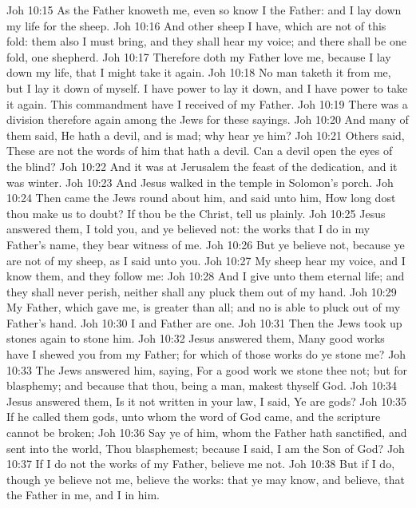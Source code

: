 \vs Joh 10:15 As the Father knoweth me, even so know I the Father: and I lay down my life for the sheep.
\vs Joh 10:16 And other sheep I have, which are not of this fold: them also I must bring, and they shall hear my voice; and there shall be one fold,  one shepherd.
\vs Joh 10:17 Therefore doth my Father love me, because I lay down my life, that I might take it again.
\vs Joh 10:18 No man taketh it from me, but I lay it down of myself. I have power to lay it down, and I have power to take it again. This commandment have I received of my Father.
\vs Joh 10:19 There was a division therefore again among the Jews for these sayings.
\vs Joh 10:20 And many of them said, He hath a devil, and is mad; why hear ye him?
\vs Joh 10:21 Others said, These are not the words of him that hath a devil. Can a devil open the eyes of the blind?
\vs Joh 10:22 And it was at Jerusalem the feast of the dedication, and it was winter.
\vs Joh 10:23 And Jesus walked in the temple in Solomon's porch.
\vs Joh 10:24 Then came the Jews round about him, and said unto him, How long dost thou make us to doubt? If thou be the Christ, tell us plainly.
\vs Joh 10:25 Jesus answered them, I told you, and ye believed not: the works that I do in my Father's name, they bear witness of me.
\vs Joh 10:26 But ye believe not, because ye are not of my sheep, as I said unto you.
\vs Joh 10:27 My sheep hear my voice, and I know them, and they follow me:
\vs Joh 10:28 And I give unto them eternal life; and they shall never perish, neither shall any  pluck them out of my hand.
\vs Joh 10:29 My Father, which gave  me, is greater than all; and no  is able to pluck  out of my Father's hand.
\vs Joh 10:30 I and  Father are one.
\vs Joh 10:31 Then the Jews took up stones again to stone him.
\vs Joh 10:32 Jesus answered them, Many good works have I shewed you from my Father; for which of those works do ye stone me?
\vs Joh 10:33 The Jews answered him, saying, For a good work we stone thee not; but for blasphemy; and because that thou, being a man, makest thyself God.
\vs Joh 10:34 Jesus answered them, Is it not written in your law, I said, Ye are gods?
\vs Joh 10:35 If he called them gods, unto whom the word of God came, and the scripture cannot be broken;
\vs Joh 10:36 Say ye of him, whom the Father hath sanctified, and sent into the world, Thou blasphemest; because I said, I am the Son of God?
\vs Joh 10:37 If I do not the works of my Father, believe me not.
\vs Joh 10:38 But if I do, though ye believe not me, believe the works: that ye may know, and believe, that the Father  in me, and I in him.
